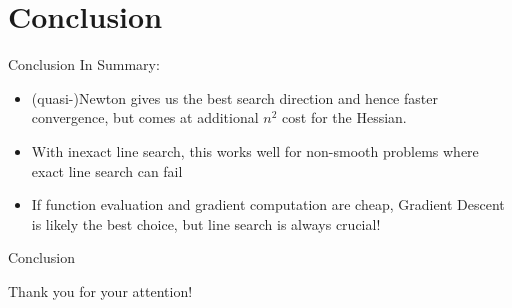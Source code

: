 \documentclass{beamer}
\begin{document}
\section{Conclusion}
\begin{frame}{Conclusion}
    In Summary:
    \begin{itemize}
        \item (quasi-)Newton gives us the best search direction
              and hence faster convergence,
              but comes at additional $n^2$ cost for the Hessian.
        \item With inexact line search, this works well
              for non-smooth problems where exact line search
              can fail
        \item If function evaluation and gradient computation
              are cheap, Gradient Descent is likely the best choice,
              but line search is always crucial!
    \end{itemize}
\end{frame}

\begin{frame}{Conclusion}
    \begin{center}
        Thank you for your attention!
    \end{center}
\end{frame}
\end{document}
